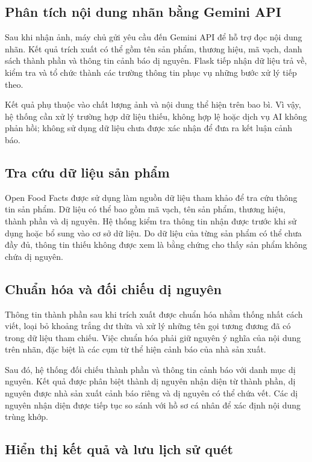 \subsection{Phân tích nội dung nhãn bằng Gemini API}

Sau khi nhận ảnh, máy chủ gửi yêu cầu đến Gemini API để hỗ trợ đọc nội dung nhãn. Kết quả trích xuất có thể gồm tên sản phẩm, thương hiệu, mã vạch, danh sách thành phần và thông tin cảnh báo dị nguyên. Flask tiếp nhận dữ liệu trả về, kiểm tra và tổ chức thành các trường thông tin phục vụ những bước xử lý tiếp theo.

Kết quả phụ thuộc vào chất lượng ảnh và nội dung thể hiện trên bao bì. Vì vậy, hệ thống cần xử lý trường hợp dữ liệu thiếu, không hợp lệ hoặc dịch vụ AI không phản hồi; không sử dụng dữ liệu chưa được xác nhận để đưa ra kết luận cảnh báo.

\subsection{Tra cứu dữ liệu sản phẩm}

Open Food Facts được sử dụng làm nguồn dữ liệu tham khảo để tra cứu thông tin sản phẩm. Dữ liệu có thể bao gồm mã vạch, tên sản phẩm, thương hiệu, thành phần và dị nguyên. Hệ thống kiểm tra thông tin nhận được trước khi sử dụng hoặc bổ sung vào cơ sở dữ liệu. Do dữ liệu của từng sản phẩm có thể chưa đầy đủ, thông tin thiếu không được xem là bằng chứng cho thấy sản phẩm không chứa dị nguyên.

\subsection{Chuẩn hóa và đối chiếu dị nguyên}

Thông tin thành phần sau khi trích xuất được chuẩn hóa nhằm thống nhất cách viết, loại bỏ khoảng trắng dư thừa và xử lý những tên gọi tương đương đã có trong dữ liệu tham chiếu. Việc chuẩn hóa phải giữ nguyên ý nghĩa của nội dung trên nhãn, đặc biệt là các cụm từ thể hiện cảnh báo của nhà sản xuất.

Sau đó, hệ thống đối chiếu thành phần và thông tin cảnh báo với danh mục dị nguyên. Kết quả được phân biệt thành dị nguyên nhận diện từ thành phần, dị nguyên được nhà sản xuất cảnh báo riêng và dị nguyên có thể chứa vết. Các dị nguyên nhận diện được tiếp tục so sánh với hồ sơ cá nhân để xác định nội dung trùng khớp.

\subsection{Hiển thị kết quả và lưu lịch sử quét}

